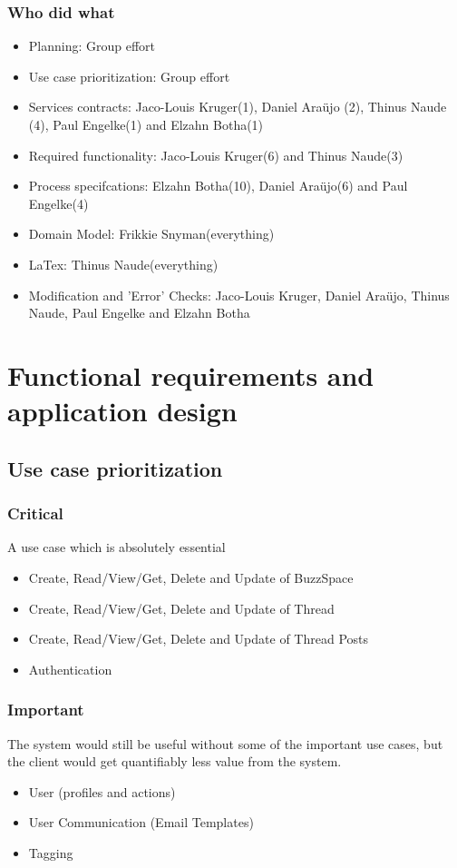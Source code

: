 \documentclass [a4paper,12pt] {article}
\begin{document}
		\subsubsection{Who did what}
			\begin{itemize}
				\item Planning: Group effort
				\item Use case prioritization: Group effort
				\item Services contracts: Jaco-Louis Kruger(1), Daniel Araüjo (2), Thinus Naude (4), Paul Engelke(1) and  Elzahn Botha(1)
				\item Required functionality: Jaco-Louis Kruger(6) and Thinus Naude(3)
				\item Process specifcations: Elzahn Botha(10), Daniel Araüjo(6) and Paul Engelke(4)
				\item Domain Model: Frikkie Snyman(everything)
				\item LaTex: Thinus Naude(everything)
				\item Modification and 'Error' Checks: Jaco-Louis Kruger, Daniel Araüjo, Thinus Naude, Paul Engelke and Elzahn Botha
			\end{itemize}
		\pagebreak
\pagebreak
\section{Functional requirements and application design}
	\subsection{Use case prioritization}
	\subsubsection{Critical}A use case which is absolutely essential
	\begin{itemize}
		\item Create, Read/View/Get, Delete and Update of BuzzSpace
		\item Create, Read/View/Get, Delete and Update of Thread
		\item Create, Read/View/Get, Delete and Update of Thread Posts
		\item Authentication	
	\end{itemize}
	\subsubsection{Important}The system would still be useful without some of the important use cases, but the client would get quantifiably less value from the system.
		\begin{itemize}
			\item User (profiles and actions)
			\item User Communication (Email Templates)
			\item Tagging
		\end{itemize}
\end{document}
